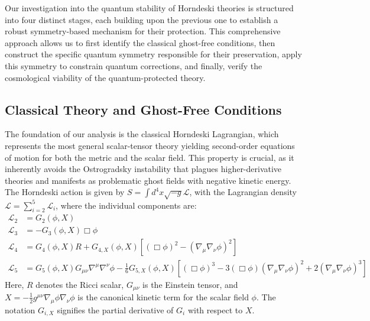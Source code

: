 \documentclass[twocolumn]{aastex631}
\begin{document}
Our investigation into the quantum stability of Horndeski theories is structured into four distinct stages, each building upon the previous one to establish a robust symmetry-based mechanism for their protection. This comprehensive approach allows us to first identify the classical ghost-free conditions, then construct the specific quantum symmetry responsible for their preservation, apply this symmetry to constrain quantum corrections, and finally, verify the cosmological viability of the quantum-protected theory.

\subsection{Classical Theory and Ghost-Free Conditions}

The foundation of our analysis is the classical Horndeski Lagrangian, which represents the most general scalar-tensor theory yielding second-order equations of motion for both the metric and the scalar field. This property is crucial, as it inherently avoids the Ostrogradsky instability that plagues higher-derivative theories and manifests as problematic ghost fields with negative kinetic energy. The Horndeski action is given by $S = \int d^4x \sqrt{-g} \mathcal{L}$, with the Lagrangian density $\mathcal{L} = \sum_{i=2}^{5} \mathcal{L}_i$, where the individual components are:
\begin{align*}
\mathcal{L}_2 &= G_2(\phi, X) \\
\mathcal{L}_3 &= -G_3(\phi, X) \Box\phi \\
\mathcal{L}_4 &= G_4(\phi, X) R + G_{4,X}(\phi, X) [(\Box\phi)^2 - (\nabla_\mu\nabla_\nu\phi)^2] \\
\mathcal{L}_5 &= G_5(\phi, X) G_{\mu\nu}\nabla^\mu\nabla^\nu\phi - \frac{1}{6}G_{5,X}(\phi, X) [(\Box\phi)^3 - 3(\Box\phi)(\nabla_\mu\nabla_\nu\phi)^2 + 2(\nabla_\mu\nabla_\nu\phi)^3]
\end{align*}
Here, $R$ denotes the Ricci scalar, $G_{\mu\nu}$ is the Einstein tensor, and $X = -\frac{1}{2}g^{\mu\nu}\nabla_\mu\phi\nabla_\nu\phi$ is the canonical kinetic term for the scalar field $\phi$. The notation $G_{i,X}$ signifies the partial derivative of $G_i$ with respect to $X$.
\end{document}
